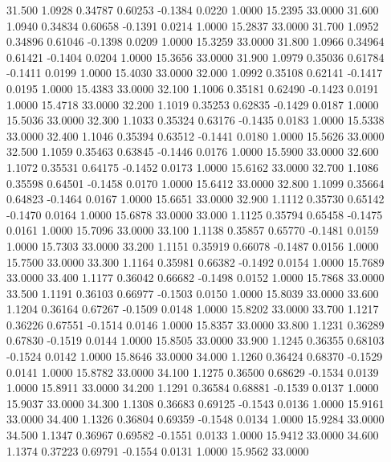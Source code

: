   31.500   1.0928   0.34787   0.60253  -0.1384   0.0220   1.0000  15.2395  33.0000
  31.600   1.0940   0.34834   0.60658  -0.1391   0.0214   1.0000  15.2837  33.0000
  31.700   1.0952   0.34896   0.61046  -0.1398   0.0209   1.0000  15.3259  33.0000
  31.800   1.0966   0.34964   0.61421  -0.1404   0.0204   1.0000  15.3656  33.0000
  31.900   1.0979   0.35036   0.61784  -0.1411   0.0199   1.0000  15.4030  33.0000
  32.000   1.0992   0.35108   0.62141  -0.1417   0.0195   1.0000  15.4383  33.0000
  32.100   1.1006   0.35181   0.62490  -0.1423   0.0191   1.0000  15.4718  33.0000
  32.200   1.1019   0.35253   0.62835  -0.1429   0.0187   1.0000  15.5036  33.0000
  32.300   1.1033   0.35324   0.63176  -0.1435   0.0183   1.0000  15.5338  33.0000
  32.400   1.1046   0.35394   0.63512  -0.1441   0.0180   1.0000  15.5626  33.0000
  32.500   1.1059   0.35463   0.63845  -0.1446   0.0176   1.0000  15.5900  33.0000
  32.600   1.1072   0.35531   0.64175  -0.1452   0.0173   1.0000  15.6162  33.0000
  32.700   1.1086   0.35598   0.64501  -0.1458   0.0170   1.0000  15.6412  33.0000
  32.800   1.1099   0.35664   0.64823  -0.1464   0.0167   1.0000  15.6651  33.0000
  32.900   1.1112   0.35730   0.65142  -0.1470   0.0164   1.0000  15.6878  33.0000
  33.000   1.1125   0.35794   0.65458  -0.1475   0.0161   1.0000  15.7096  33.0000
  33.100   1.1138   0.35857   0.65770  -0.1481   0.0159   1.0000  15.7303  33.0000
  33.200   1.1151   0.35919   0.66078  -0.1487   0.0156   1.0000  15.7500  33.0000
  33.300   1.1164   0.35981   0.66382  -0.1492   0.0154   1.0000  15.7689  33.0000
  33.400   1.1177   0.36042   0.66682  -0.1498   0.0152   1.0000  15.7868  33.0000
  33.500   1.1191   0.36103   0.66977  -0.1503   0.0150   1.0000  15.8039  33.0000
  33.600   1.1204   0.36164   0.67267  -0.1509   0.0148   1.0000  15.8202  33.0000
  33.700   1.1217   0.36226   0.67551  -0.1514   0.0146   1.0000  15.8357  33.0000
  33.800   1.1231   0.36289   0.67830  -0.1519   0.0144   1.0000  15.8505  33.0000
  33.900   1.1245   0.36355   0.68103  -0.1524   0.0142   1.0000  15.8646  33.0000
  34.000   1.1260   0.36424   0.68370  -0.1529   0.0141   1.0000  15.8782  33.0000
  34.100   1.1275   0.36500   0.68629  -0.1534   0.0139   1.0000  15.8911  33.0000
  34.200   1.1291   0.36584   0.68881  -0.1539   0.0137   1.0000  15.9037  33.0000
  34.300   1.1308   0.36683   0.69125  -0.1543   0.0136   1.0000  15.9161  33.0000
  34.400   1.1326   0.36804   0.69359  -0.1548   0.0134   1.0000  15.9284  33.0000
  34.500   1.1347   0.36967   0.69582  -0.1551   0.0133   1.0000  15.9412  33.0000
  34.600   1.1374   0.37223   0.69791  -0.1554   0.0131   1.0000  15.9562  33.0000
